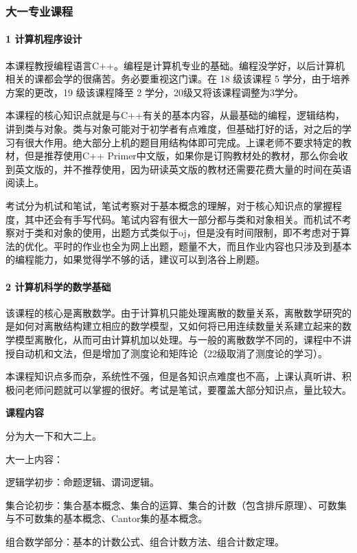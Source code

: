 \documentclass[
decoration,  %
]{qyxf-book}
\begin{document}
\subsubsection{大一专业课程}

\paragraph{1 计算机程序设计}
本课程教授编程语言C++。编程是计算机专业的基础。编程没学好，以后计算机相关的课都会学的很痛苦。务必要重视这门课。在 18 级该课程 5 学分，由于培养方案的更改，19 级该课程降至 2 学分，20级又将该课程调整为3学分。


本课程的核心知识点就是与C++有关的基本内容，从最基础的编程，逻辑结构，讲到类与对象。类与对象可能对于初学者有点难度，但基础打好的话，对之后的学习有很大作用。绝大部分上机的题目用结构体即可完成。上课老师不要求特定的教材，但是推荐使用C++ Primer中文版，如果你是订购教材处的教材，那么你会收到英文版的，并不推荐使用，因为研读英文版的教材还需要花费大量的时间在英语阅读上。


考试分为机试和笔试，笔试考察对于基本概念的理解，对于核心知识点的掌握程度，其中还会有手写代码。笔试内容有很大一部分都与类和对象相关。而机试不考察对于类和对象的使用，出题方式类似于oj，但是没有时间限制，即不考虑对于算法的优化。平时的作业也全为网上出题，题量不大，而且作业内容也只涉及到基本的编程能力，如果觉得学不够的话，建议可以到洛谷上刷题。


\paragraph{2 计算机科学的数学基础}
该课程的核心是离散数学。由于计算机只能处理离散的数量关系，离散数学研究的是如何对离散结构建立相应的数学模型，又如何将已用连续数量关系建立起来的数学模型离散化，从而可由计算机加以处理。与一般的离散数学不同的，课程中不讲授自动机和文法，但是增加了测度论和矩阵论（22级取消了测度论的学习）。


本课程知识点多而杂，系统性不强，但是各知识点难度也不高，上课认真听讲、积极问老师问题就可以掌握的很好。考试是笔试，要覆盖大部分知识点，量比较大。


\textbf{课程内容} \par
分为大一下和大二上。

大一上内容：

逻辑学初步：命题逻辑、谓词逻辑。

集合论初步：集合基本概念、集合的运算、集合的计数（包含排斥原理）、可数集与不可数集的基本概念、Cantor集的基本概念。

组合数学部分：基本的计数公式、组合计数方法、组合计数定理。
\end{document}
